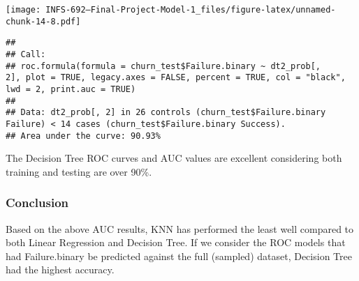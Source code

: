 \documentclass[
]{article}
\begin{document}
\texttt{[image: INFS-692---Final-Project-Model-1\_files/figure-latex/unnamed-chunk-14-8.pdf]}

\begin{verbatim}
## 
## Call:
## roc.formula(formula = churn_test$Failure.binary ~ dt2_prob[,     2], plot = TRUE, legacy.axes = FALSE, percent = TRUE, col = "black",     lwd = 2, print.auc = TRUE)
## 
## Data: dt2_prob[, 2] in 26 controls (churn_test$Failure.binary Failure) < 14 cases (churn_test$Failure.binary Success).
## Area under the curve: 90.93%
\end{verbatim}

The Decision Tree ROC curves and AUC values are excellent considering
both training and testing are over 90\%.

\hypertarget{conclusion}{%
\subsubsection{Conclusion}\label{conclusion}}

Based on the above AUC results, KNN has performed the least well
compared to both Linear Regression and Decision Tree. If we consider the
ROC models that had Failure.binary be predicted against the full
(sampled) dataset, Decision Tree had the highest accuracy.
\end{document}
